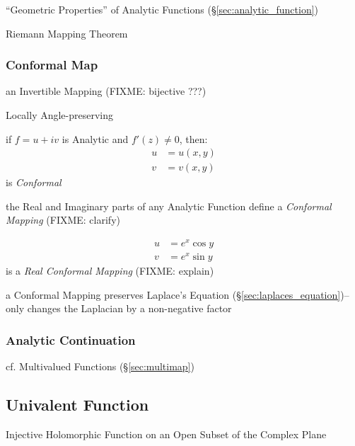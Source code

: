 ``Geometric Properties'' of Analytic Functions (\S\ref{sec:analytic_function})

Riemann Mapping Theorem



\subsubsection{Conformal Map}\label{sec:conformal_map}

an Invertible Mapping (FIXME: bijective ???)

Locally Angle-preserving

if $f = u + iv$ is Analytic and $f'(z) \neq 0$, then:
\begin{align*}
  u & = u(x,y) \\
  v & = v(x,y)
\end{align*}
is \emph{Conformal}

the Real and Imaginary parts of any Analytic Function define a \emph{Conformal
  Mapping} (FIXME: clarify)

\begin{align*}
  u & = e^x \cos y \\
  v & = e^x \sin y
\end{align*}
is a \emph{Real Conformal Mapping} (FIXME: explain)

a Conformal Mapping preserves Laplace's Equation
(\S\ref{sec:laplaces_equation})-- only changes the Laplacian by a non-negative
factor



\subsubsection{Analytic Continuation}\label{sec:analytic_continuation}

cf. Multivalued Functions (\S\ref{sec:multimap})



\subsection{Univalent Function}\label{sec:univalent_function}

Injective Holomorphic Function on an Open Subset of the Complex Plane



